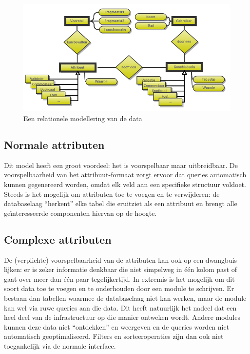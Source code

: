 \begin{figure}[ht]
	\begin{center}
		\includegraphics[width=1.0\columnwidth]{images/databasemodel.png}
		\caption{Een relationele modellering van de data}
		\label{fig:databasemodel}
	\end{center}
\end{figure}

\subsection{Normale attributen}
Dit model heeft een groot voordeel: het is voorspelbaar maar uitbreidbaar. De voorspelbaarheid van het attribuut-formaat zorgt ervoor dat queries automatisch kunnen gegenereerd worden, omdat elk veld aan een specifieke structuur voldoet. Steeds is het mogelijk om attributen toe te voegen en te verwijderen: de databaselaag ``herkent'' elke tabel die eruitziet als een attribuut en brengt alle ge\"interesseerde componenten hiervan op de hoogte.

\subsection{Complexe attributen}
De (verplichte) voorspelbaarheid van de attributen kan ook op een dwangbuis lijken: er is zeker informatie denkbaar die niet simpelweg in \'e\'en kolom past of gaat over meer dan \'e\'en paar tegelijkertijd. In extremis is het mogelijk om dit soort data toe te voegen en te onderhouden door een module te schrijven. Er bestaan dan tabellen waarmee de databaselaag niet kan werken, maar de module kan wel via ruwe queries aan die data. Dit heeft natuurlijk het nadeel dat een heel deel van de infrastructuur op die manier ontweken wordt. Andere modules kunnen deze data niet ``ontdekken'' en weergeven en de queries worden niet automatisch geoptimaliseerd. Filters en sorteeroperaties zijn dan ook niet toegankelijk via de normale interface.\\


